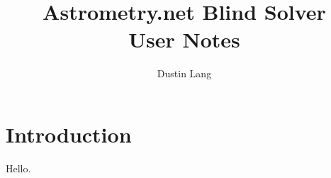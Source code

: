 \documentclass[12pt,letterpaper]{article}
\begin{document}
\title{Astrometry.net Blind Solver \\ User Notes}
\author{Dustin Lang}

\maketitle

\newpage

\section*{Introduction}

Hello.
\end{document}
